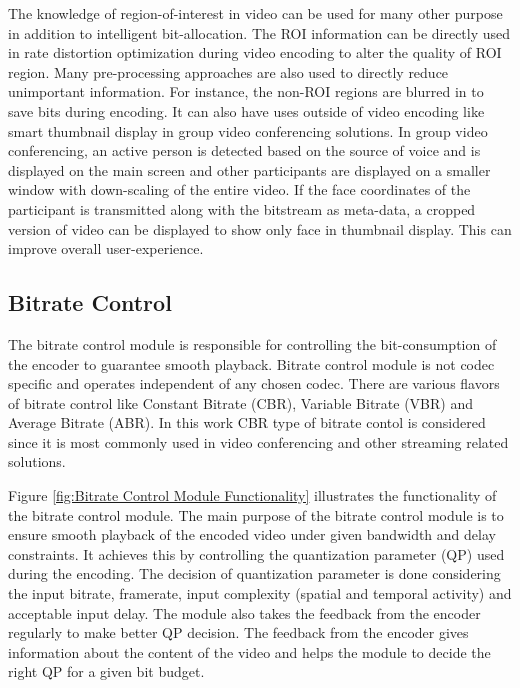 \documentclass[11pt]{article} %
\begin{document}
The knowledge of region-of-interest in video can be used for many other purpose in addition to intelligent bit-allocation. The ROI information can be directly used in rate distortion optimization during video encoding to alter the quality of ROI region. Many pre-processing approaches are also used to directly reduce unimportant information. For instance, the non-ROI regions are blurred in \cite{ROI-background-blurring} to save bits during encoding. It can also have uses outside of video encoding like smart thumbnail display in group video conferencing solutions. In group video conferencing, an active person is detected based on the source of voice and is displayed on the main screen and other participants are displayed on a smaller window with down-scaling of the entire video. If the face coordinates of the participant is transmitted along with the bitstream as meta-data, a cropped version of video can be displayed to show only face in thumbnail display. This can improve overall user-experience.

\subsection{Bitrate Control}
	The bitrate control module is responsible for controlling the bit-consumption of the encoder to guarantee smooth playback. Bitrate control module is not codec specific and operates independent of any chosen codec. There are various flavors of bitrate control like Constant Bitrate (CBR), Variable Bitrate (VBR) and Average Bitrate (ABR). In this work CBR type of bitrate contol is considered since it is most commonly used in video conferencing and other streaming related solutions. 
	
	Figure \ref{fig:Bitrate Control Module Functionality} illustrates the functionality of the bitrate control module. The main purpose of the bitrate control module is to ensure smooth playback of the encoded video under given bandwidth and delay constraints.  It achieves this by controlling the quantization parameter (QP) used during the encoding. The decision of quantization parameter is done considering the input bitrate, framerate, input complexity (spatial and temporal activity) and acceptable input delay. The module also takes the feedback from the encoder regularly to make better QP decision.  The feedback from the encoder gives information about the content of the video and helps the module to decide the right QP for a given bit budget.
	
\end{document}
